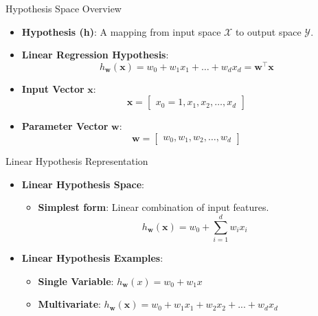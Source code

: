 \documentclass[serif, aspectratio=169]{beamer}
\begin{document}
\begin{frame}{Hypothesis Space Overview}
    \begin{itemize}
        \item \textbf{Hypothesis (h)}: A mapping from input space \( \mathcal{X} \) to output space \( \mathcal{Y} \).
        \item \textbf{Linear Regression Hypothesis}:
        \[
        h_{\mathbf{w}}(\mathbf{x}) = w_0 + w_1 x_1 + \dots + w_d x_d = \mathbf{w}^\top \mathbf{x}
        \]
        \item \textbf{Input Vector} \( \mathbf{x} \):
        \[
        \mathbf{x} = \begin{bmatrix} x_0 = 1, x_1, x_2, \dots, x_d \end{bmatrix}
        \]
        \item \textbf{Parameter Vector} \( \mathbf{w} \):
        \[
        \mathbf{w} = \begin{bmatrix} w_0, w_1, w_2, \dots, w_d \end{bmatrix}
        \]
    \end{itemize}
\end{frame}





\begin{frame}{Linear Hypothesis Representation}
    \begin{itemize}
        \item \textbf{Linear Hypothesis Space}:
        \begin{itemize}
            \item \textbf{Simplest form}: Linear combination of input features.
            \[
            h_{\mathbf{w}}(\mathbf{x}) = w_0 + \sum_{i=1}^{d} w_i x_i
            \]
        \end{itemize}
        \item \textbf{Linear Hypothesis Examples}:
        \begin{itemize}
            \item \textbf{Single Variable}: \( h_{\mathbf{w}}(x) = w_0 + w_1 x \)
            \item \textbf{Multivariate}: \( h_{\mathbf{w}}(\mathbf{x}) = w_0 + w_1 x_1 + w_2 x_2 + ... + w_d x_d \)
        \end{itemize}
    \end{itemize}
\end{frame}
\end{document}
